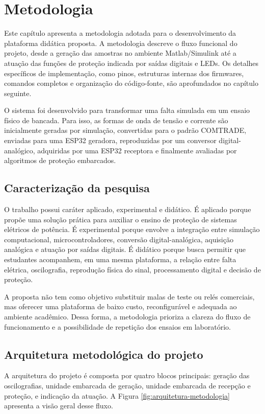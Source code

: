 \chapter{Metodologia}

Este capítulo apresenta a metodologia adotada para o desenvolvimento da plataforma didática proposta. A metodologia descreve o fluxo funcional do projeto, desde a geração das amostras no ambiente Matlab/Simulink até a atuação das funções de proteção indicada por saídas digitais e LEDs. Os detalhes específicos de implementação, como pinos, estruturas internas dos firmwares, comandos completos e organização do código-fonte, são aprofundados no capítulo seguinte.

O sistema foi desenvolvido para transformar uma falta simulada em um ensaio físico de bancada. Para isso, as formas de onda de tensão e corrente são inicialmente geradas por simulação, convertidas para o padrão COMTRADE, enviadas para uma ESP32 geradora, reproduzidas por um conversor digital-analógico, adquiridas por uma ESP32 receptora e finalmente avaliadas por algoritmos de proteção embarcados.

\section{Caracterização da pesquisa}

O trabalho possui caráter aplicado, experimental e didático. É aplicado porque propõe uma solução prática para auxiliar o ensino de proteção de sistemas elétricos de potência. É experimental porque envolve a integração entre simulação computacional, microcontroladores, conversão digital-analógica, aquisição analógica e atuação por saídas digitais. É didático porque busca permitir que estudantes acompanhem, em uma mesma plataforma, a relação entre falta elétrica, oscilografia, reprodução física do sinal, processamento digital e decisão de proteção.

A proposta não tem como objetivo substituir malas de teste ou relés comerciais, mas oferecer uma plataforma de baixo custo, reconfigurável e adequada ao ambiente acadêmico. Dessa forma, a metodologia prioriza a clareza do fluxo de funcionamento e a possibilidade de repetição dos ensaios em laboratório.

\section{Arquitetura metodológica do projeto}

A arquitetura do projeto é composta por quatro blocos principais: geração das oscilografias, unidade embarcada de geração, unidade embarcada de recepção e proteção, e indicação da atuação. A Figura \ref{fig:arquitetura-metodologia} apresenta a visão geral desse fluxo.

